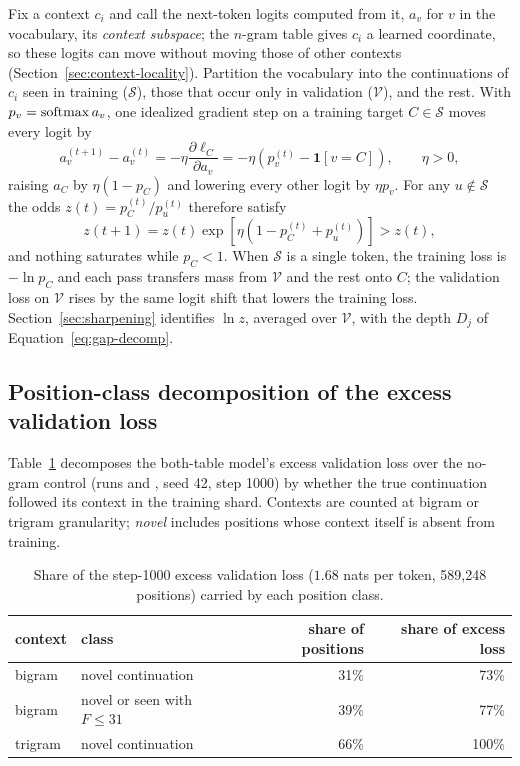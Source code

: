Fix a context $c_i$ and call the next-token logits computed from it, $a_v$ for $v$ in the vocabulary, its \emph{context subspace}; the $n$-gram table gives $c_i$ a learned coordinate, so these logits can move without moving those of other contexts (Section~\ref{sec:context-locality}). Partition the vocabulary into the continuations of $c_i$ seen in training ($\mathcal{S}$), those that occur only in validation ($\mathcal{V}$), and the rest. With $p_v=\operatorname{softmax}{a_v}$, one idealized gradient step on a training target $C\in\mathcal{S}$ moves every logit by
\begin{equation}
a_v^{(t+1)}-a_v^{(t)}=-\eta\frac{\partial\ell_C}{\partial a_v}=-\eta\left(p_v^{(t)}-\mathbf{1}[v=C]\right),\qquad \eta>0,
\label{eq:av}
\end{equation}
raising $a_C$ by $\eta(1-p_C)$ and lowering every other logit by $\eta p_v$. For any $u\notin\mathcal{S}$ the odds $z(t)=p_C^{(t)}/p_u^{(t)}$ therefore satisfy
\begin{equation}
z(t+1)=z(t)\exp\!\left[\eta\left(1-p_C^{(t)}+p_u^{(t)}\right)\right]>z(t),
\label{eq:zt}
\end{equation}
and nothing saturates while $p_C<1$. When $\mathcal{S}$ is a single token, the training loss is $-\ln p_C$ and each pass transfers mass from $\mathcal{V}$ and the rest onto $C$; the validation loss on $\mathcal{V}$ rises by the same logit shift that lowers the training loss. Section~\ref{sec:sharpening} identifies $\ln z$, averaged over $\mathcal{V}$, with the depth $D_j$ of Equation~\eqref{eq:gap-decomp}.

\subsection{Position-class decomposition of the excess validation loss}
\label{app:novel-share}

Table~\ref{tab:novel-share} decomposes the both-table model's excess validation loss over the no-gram control (runs  and , seed 42, step 1000) by whether the true continuation followed its context in the training shard. Contexts are counted at bigram or trigram granularity; \emph{novel} includes positions whose context itself is absent from training.

\begin{table}[!htbp]
\centering\small
\caption{Share of the step-1000 excess validation loss ($1.68$ nats per token, 589{,}248 positions) carried by each position class.}
\label{tab:novel-share}
\begin{tabular}{llrr}
\toprule
context & class & share of positions & share of excess loss \\
\midrule
bigram & novel continuation & 31\% & 73\% \\
bigram & novel or seen with $F\le 31$ & 39\% & 77\% \\
trigram & novel continuation & 66\% & 100\% \\
\bottomrule
\end{tabular}
\end{table}

